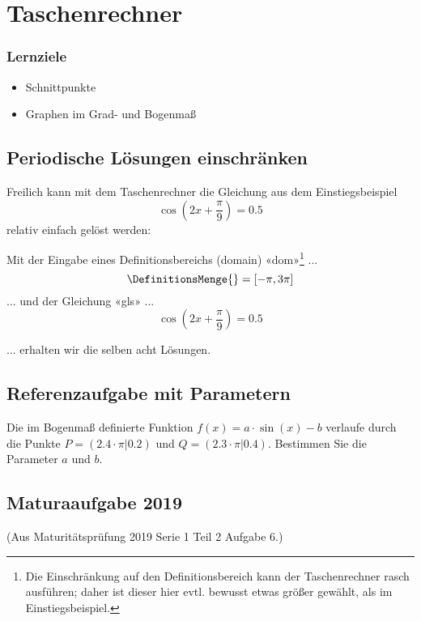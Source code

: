 
\section{Taschenrechner}

\subsubsection*{Lernziele}

\begin{itemize}
\item Schnittpunkte
\item Graphen im Grad- und Bogenmaß
\end{itemize}

\subsection{Periodische Lösungen einschränken}
Freilich kann mit dem Taschenrechner die Gleichung aus dem
Einstiegsbeispiel $$\cos\left(2x+\frac{\pi}{9}\right)=0.5$$ relativ einfach gelöst werden:

Mit der Eingabe eines Definitionsbereichs (domain) «dom»\footnote{Die Einschränkung auf den Definitionsbereich kann der Taschenrechner rasch ausführen; daher ist dieser hier evtl. bewusst etwas größer gewählt, als im Einstiegsbeispiel.}  ...
$$\DefinitionsMenge{} =  [ -\pi , 3\pi]$$
... und der Gleichung «gls» ...
$$\cos\left(2x+\frac{\pi}{9}\right) = 0.5$$

... erhalten wir die selben acht Lösungen.
    

\newpage

\subsection{Referenzaufgabe mit Parametern}
Die im Bogenmaß definierte Funktion $f(x) = a\cdot{}\sin(x)-b$
verlaufe durch die Punkte $P=(2.4\cdot{}\pi | 0.2)$ und
$Q=(2.3\cdot{}\pi|0.4)$. Bestimmen Sie die Parameter $a$ und $b$.


\subsection{Maturaaufgabe 2019}
(Aus Maturitätsprüfung 2019 Serie 1 Teil 2 Aufgabe 6.)

